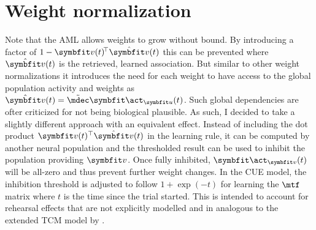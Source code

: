 \section{Weight normalization}
Note that the AML allows weights to grow without bound.
By introducing a factor of $1 - \vc v(t)\!\Tr \hat{\vc v}(t)$ this can be prevented where $\hat{\vc v}(t)$ is the retrieved, learned association.
But similar to other weight normalizations it introduces the need for each weight to have access to the global population activity and weights as $\hat{\vc v}(t) = \tilde{\mdec} \vc\act_{\vc u}(t)$.
Such global dependencies are ofter criticized for not being biological plausible.
As such, I decided to take a slightly different approach with an equivalent effect.
Instead of including the dot product $\vc v(t)\Tr \hat{\vc v}(t)$ in the learning rule, it can be computed by another neural population and the thresholded result can be used to inhibit the population providing $\vc v$.
Once fully inhibited, $\vc\act_{\vc v}(t)$ will be all-zero and thus prevent further weight changes.
In the CUE model, the inhibition threshold is adjusted to follow $1 + \exp(-t)$ for learning the $\mtf$ matrix where $t$ is the time since the trial started.
This is intended to account for rehearsal effects that are not explicitly modelled and in analogous to the extended TCM model by \textcite{Sederberg2008}.
